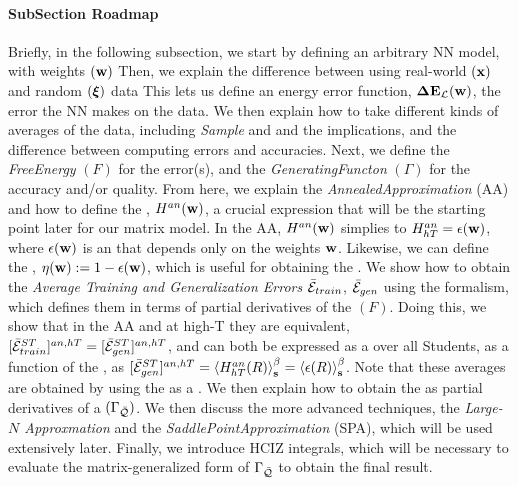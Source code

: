 \paragraph{SubSection Roadmap}
Briefly, in the following subsection,
we start by defining an arbitrary NN model, with weights $({\mathbf{w}})$
Then, we explain the difference between using real-world $({\mathbf{x}})$ and random $(\boldsymbol{\xi})$ data
This lets us define an energy error function, $\mathbf{\Delta {E}}_{\mathcal{L}}(\mathbf{w})$,
the error the NN makes on the data.
We then explain how to take different kinds of \emph{\Thermodynamic} averages of the data,
including \emph{Sample} and \emph{\ThermalAverages} and the implications,
and the difference between computing errors and accuracies.
Next, we define the \emph{FreeEnergy} $(F)$ for the error(s), and the \emph{GeneratingFuncton}  $(\Gamma)$
for the accuracy and/or quality.
From here, we explain the \emph{AnnealedApproximation} (AA) and
how to define the  \emph{\AnnealedHamiltonian}, $H^{an}({\mathbf{w}})$, a crucial expression
that will be the starting point later for our matrix model.
In the AA, $H^{an}({\mathbf{w}})$ simplies to  $H^{an}_{hT}=\epsilon({\mathbf{w}})$, where $\epsilon({\mathbf{w}})$ is an \EffectivePotential
that depends only on the weights ${\mathbf{w}}$.
Likewise, we can define the \SelfOverlap, $\eta({\mathbf{w}}):=1-\epsilon({\mathbf{w}})$, which is useful for
obtaining the \Quality.
We show how to obtain the \emph{Average Training and Generalization Errors} $\bar{\mathcal{E}}_{train}$, $\bar{\mathcal{E}}_{gen}$
using the \STATMECH formalism, which defines them in terms of partial derivatives of the \FreeEnergy $(F)$.
Doing this, we show that in the AA and at high-T they are equivalent,
$[\bar{\mathcal{E}}^{ST}_{train}]^{an,hT}=[\bar{\mathcal{E}}^{ST}_{gen}]^{an,hT}$,
and can both be expressed as a \ThermalAverage over all Students, as a function 
of the \Teacher, as $[\bar{\mathcal{E}}^{ST}_{gen}]^{an,hT}=\left\langle H^{an}_{hT}(R) \right\rangle_{\mathbf s}^{\beta}=\left\langle \epsilon(R) \right\rangle_{\mathbf s}^{\beta}$.
Note that these averages are obtained by using the \FreeEnergy as a \GeneratingFunction.
We then explain how to obtain the \ModelQuality  as  partial derivatives of a
\emph{\GeneratingFunction} $(\Gamma_{\bar{\mathcal{Q}}})$.
We then discuss the more advanced techniques, the
\emph{Large-$N$ Approxmation} and the \emph{SaddlePointApproximation} (SPA),
which will be used extensively later.
Finally, we introduce  HCIZ integrals, which will be necessary to evaluate the matrix-generalized
form of $\Gamma_{\bar{\mathcal{Q}}}$ to obtain the final result.
